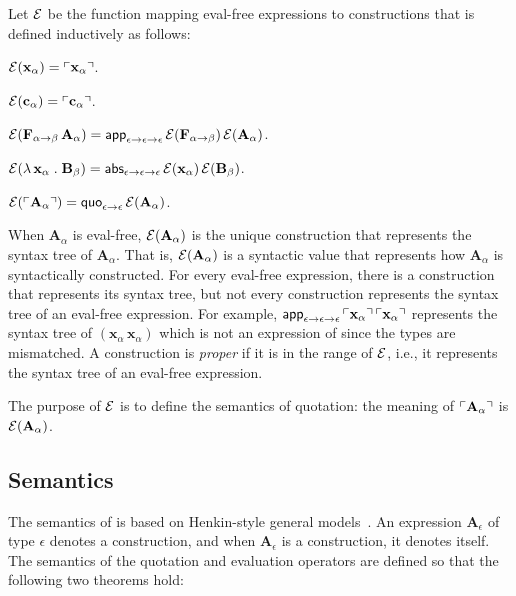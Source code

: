 \documentclass[fleqn]{llncs}
\begin{document}
Let $\mbox{$\cal E$}$ be the function mapping eval-free expressions to
constructions that is defined inductively as follows:

\be

  \item $\mbox{$\cal E$}(\textbf{x}_\alpha) = \ulcorner\textbf{x}_\alpha\urcorner$.

  \item $\mbox{$\cal E$}(\textbf{c}_\alpha) = \ulcorner\textbf{c}_\alpha\urcorner$.

  \item $\mbox{$\cal E$}(\textbf{F}_{\alpha \rightarrow \beta} \, \textbf{A}_\alpha) =
    \mbox{\sf app}_{\epsilon \rightarrow \epsilon \rightarrow \epsilon} \,
    \mbox{$\cal E$}(\textbf{F}_{\alpha \rightarrow \beta}) \, \mbox{$\cal E$}(\textbf{A}_\alpha)$.

  \item $\mbox{$\cal E$}(\lambda\, \textbf{x}_\alpha \mathrel. \textbf{B}_\beta) =
    \mbox{\sf abs}_{\epsilon \rightarrow \epsilon \rightarrow \epsilon} \,
    \mbox{$\cal E$}(\textbf{x}_\alpha) \, \mbox{$\cal E$}(\textbf{B}_\beta)$.

  \item $\mbox{$\cal E$}(\ulcorner\textbf{A}_\alpha\urcorner) = \mbox{\sf quo}_{\epsilon
    \rightarrow \epsilon} \, \mbox{$\cal E$}(\textbf{A}_\alpha)$.

\ee

\noindent
When $\textbf{A}_\alpha$ is eval-free, $\mbox{$\cal E$}(\textbf{A}_\alpha)$ is the
unique construction that represents the syntax tree of
$\textbf{A}_\alpha$.  That is, $\mbox{$\cal E$}(\textbf{A}_\alpha)$ is a syntactic
value that represents how $\textbf{A}_\alpha$ is syntactically
constructed.  For every eval-free expression, there is a construction
that represents its syntax tree, but not every construction represents
the syntax tree of an eval-free expression.  For example,
$\mbox{\sf app}_{\epsilon \rightarrow \epsilon \rightarrow \epsilon} \,
\ulcorner\textbf{x}_\alpha\urcorner \, \ulcorner\textbf{x}_\alpha\urcorner$
represents the syntax tree of $(\textbf{x}_\alpha \,
\textbf{x}_\alpha)$ which is not an expression of {\churchqe} since
the types are mismatched.  A construction is \emph{proper} if it is in
the range of $\mbox{$\cal E$}$, i.e., it represents the syntax tree of an
eval-free expression.

The purpose of $\mbox{$\cal E$}$ is to define the semantics of quotation: the
meaning of $\ulcorner\textbf{A}_\alpha\urcorner$ is $\mbox{$\cal E$}(\textbf{A}_\alpha)$.

\subsection{Semantics}

The semantics of {\churchqe} is based on Henkin-style general
models~\cite{Henkin50}.  An expression $\textbf{A}_\epsilon$ of type
$\epsilon$ denotes a construction, and when $\textbf{A}_\epsilon$ is a
construction, it denotes itself.  The semantics of the quotation and
evaluation operators are defined so that the following two theorems
hold:
\end{document}
